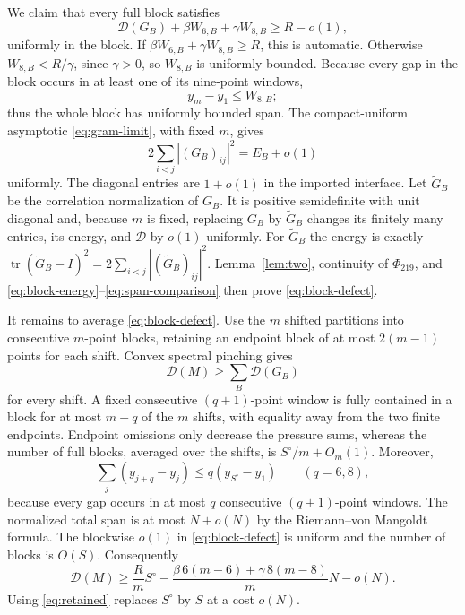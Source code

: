 \documentclass[11pt]{amsart}
\theoremstyle{remark}
\newcommand{\D}{\mathcal D}
\begin{document}
We claim that every full block satisfies
\begin{equation}\label{eq:block-defect}
 \D(G_B)+\beta W_{6,B}+\gamma W_{8,B}\ge R-o(1),
\end{equation}
uniformly in the block.  If
$\beta W_{6,B}+\gamma W_{8,B}\ge R$, this is automatic.  Otherwise
$W_{8,B}<R/\gamma$, since $\gamma>0$, so $W_{8,B}$ is uniformly bounded.
Because every gap in the block occurs in at least one of its nine-point
windows,
\[
 y_m-y_1\le W_{8,B};
\]
thus the whole block has uniformly bounded span.  The compact-uniform
asymptotic \eqref{eq:gram-limit}, with fixed $m$, gives
\[
 2\sum_{i<j}|(G_B)_{ij}|^2=E_B+o(1)
\]
uniformly.  The diagonal entries are $1+o(1)$ in the imported interface.
Let $\widetilde G_B$ be the correlation normalization of $G_B$.  It is
positive semidefinite with unit diagonal and, because $m$ is fixed, replacing
$G_B$ by $\widetilde G_B$ changes its finitely many entries, its energy, and
$\D$ by $o(1)$ uniformly.  For $\widetilde G_B$ the energy is exactly
$\operatorname{tr}(\widetilde G_B-I)^2
=2\sum_{i<j}|(\widetilde G_B)_{ij}|^2$.
Lemma~\ref{lem:two}, continuity of $\Phi_{219}$, and
\eqref{eq:block-energy}--\eqref{eq:span-comparison} then prove
\eqref{eq:block-defect}.

It remains to average \eqref{eq:block-defect}.  Use the $m$ shifted
partitions into consecutive $m$-point blocks, retaining an endpoint block of
at most $2(m-1)$ points for each shift.  Convex spectral pinching gives
\[
 \D(M)\ge\sum_B\D(G_B)
\]
for every shift.  A fixed consecutive $(q+1)$-point window is fully contained
in a block for at most $m-q$ of the $m$ shifts, with equality away from the
two finite endpoints.  Endpoint omissions only decrease the pressure sums,
whereas the number of full blocks, averaged over the shifts, is
$S^\circ/m+O_m(1)$.  Moreover,
\begin{equation}\label{eq:window-count}
 \sum_j(y_{j+q}-y_j)
 \le q(y_{S^\circ}-y_1)\qquad(q=6,8),
\end{equation}
because every gap occurs in at most $q$ consecutive $(q+1)$-point windows.
The normalized total span is at most $N+o(N)$ by the
Riemann--von Mangoldt formula.  The blockwise $o(1)$ in
\eqref{eq:block-defect} is uniform and the number of blocks is $O(S)$.
Consequently
\begin{equation}\label{eq:global-defect}
 \D(M)\ge
 \frac{R}{m}S^\circ
 -\frac{\beta\,6(m-6)+\gamma\,8(m-8)}mN-o(N).
\end{equation}
Using \eqref{eq:retained} replaces $S^\circ$ by $S$ at a cost $o(N)$.
\end{document}
